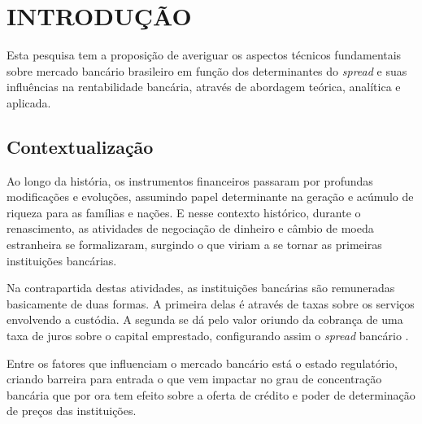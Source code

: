 \documentclass[
  12pt,
  12pt,
  openright,
  oneside,
  a4paper,
  chapter=TITLE,
  section=TITLE,
  subsection=TITLE,
  subsubsection=TITLE,
  portugues,
  sumario=tradicional]{abntex2}
\begin{document}





\textual
\pagestyle{simple}
\parindent 1.50cm

\chapter[INTRODUÇÃO]{INTRODUÇÃO}

Esta pesquisa tem a proposição de averiguar os aspectos técnicos fundamentais sobre mercado bancário brasileiro em função dos determinantes do \emph{spread} e suas influências na rentabilidade bancária, através de abordagem teórica, analítica e aplicada.

\section{Contextualização}

Ao longo da história, os instrumentos financeiros passaram por profundas modificações e evoluções, assumindo papel determinante na geração e acúmulo de riqueza para as famílias e nações. E nesse contexto histórico, durante o renascimento, as atividades de negociação de dinheiro e câmbio de moeda estranheira se formalizaram, surgindo o que viriam a se tornar as primeiras instituições bancárias.

Na contrapartida destas atividades, as instituições bancárias são remuneradas basicamente de duas formas. A primeira delas é através de taxas sobre os serviços envolvendo a custódia. A segunda se dá pelo valor oriundo da cobrança de uma taxa de juros sobre o capital emprestado, configurando assim o \emph{spread} bancário \cite{leite:1996, campello:2005, neves:2007}.

Entre os fatores que influenciam o mercado bancário está o estado regulatório, criando barreira para entrada o que vem impactar no grau de concentração bancária que por ora tem efeito sobre a oferta de crédito e poder de determinação de preços das instituições.
\end{document}
